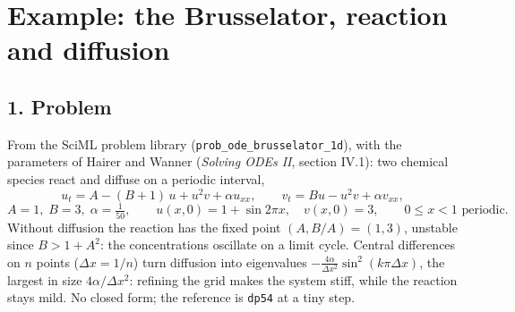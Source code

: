 \documentclass[11pt,a4paper]{article}
\begin{document}
\section*{Example: the Brusselator, reaction and diffusion}

\subsection*{1. Problem}
From the SciML problem library (\texttt{prob\_ode\_brusselator\_1d}), with the
parameters of Hairer and Wanner (\emph{Solving ODEs II}, section IV.1): two
chemical species react and diffuse on a periodic interval,
\begin{equation*}
  u_t = A - (B + 1)\,u + u^2 v + \alpha u_{xx}, \qquad
  v_t = B u - u^2 v + \alpha v_{xx},
\end{equation*}
\begin{equation*}
  A = 1,\; B = 3,\; \alpha = \tfrac1{50}, \qquad u(x, 0) = 1 + \sin 2\pi x,
  \quad v(x, 0) = 3, \qquad 0 \le x < 1 \text{ periodic}.
\end{equation*}
Without diffusion the reaction has the fixed point $(A, B/A) = (1, 3)$,
unstable since $B > 1 + A^2$: the concentrations oscillate on a limit cycle.
Central differences on $n$ points ($\Delta x = 1/n$) turn diffusion into
eigenvalues $-\tfrac{4\alpha}{\Delta x^2}\sin^2(k\pi\Delta x)$, the largest
in size $4\alpha/\Delta x^2$: refining the grid makes the system stiff, while
the reaction stays mild. No closed form; the reference is \texttt{dp54} at a
tiny step.
\begin{center}
\small

\end{center}

\newpage
\end{document}
